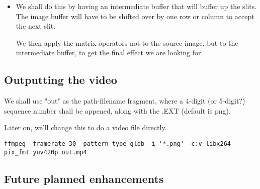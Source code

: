 \documentclass[letterpaper, 11pt]{article}
\begin{document}
\begin{itemize}
\item We shall do this by having an intermediate buffer
that will buffer up the slits. The image buffer
will have to be shifted over by one row or column to 
accept the next slit. 

We then apply the matrix operators not to the source 
image, but to the intermediate buffer, to get the
final effect we are looking for.
\end{itemize}

\subsection{Outputting the video}
\label{sec:org09162fe}
We shall use "out" as the path-filename fragment, where
a 4-digit (or 5-digit?) sequence number shall be appened,
along with the .EXT (default is png).

Later on, we'll change this to do a video file directly. 

\begin{verbatim}
ffmpeg -framerate 30 -pattern_type glob -i '*.png' -c:v libx264 -pix_fmt yuv420p out.mp4
\end{verbatim}


\subsection{Future planned enhancements}
\label{sec:org2aa5e4b}
\end{document}
